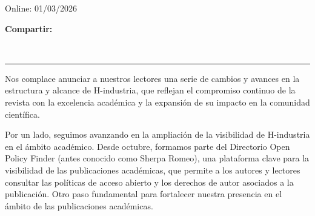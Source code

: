 \documentclass{article}
\begin{document}
\begin{textblock*}{68mm}
{\begin{minipage}[t]{68mm}
Online: 01/03/2026\par
\vspace{6pt}
\vspace{6pt}
{\bfseries\color{azulrevista!70}Compartir:}\par\vspace{3pt}
{\large
\href{https://bsky.app/intent/compose?text=url-html}{}~
\href{mailto:?subject=T%C3%ADtulo%20del%20editorial%20de%20la%20revista&body=url-html}{}~
\href{https://www.facebook.com/sharer/sharer.php?u=url-html}{}~
\href{https://www.linkedin.com/sharing/share-offsite/?url=url-html}{}~
\href{https://www.reddit.com/submit?url=url-html&title=T%C3%ADtulo%20del%20editorial%20de%20la%20revista}{}~
\href{https://www.researchgate.net/search?q=T%C3%ADtulo%20del%20editorial%20de%20la%20revista}{}~
\href{https://t.me/share/url?url=url-html&text=T%C3%ADtulo%20del%20editorial%20de%20la%20revista}{}~
\href{https://wa.me/?text=url-html}{}~
\href{https://twitter.com/intent/tweet?url=url-html&text=T%C3%ADtulo%20del%20editorial%20de%20la%20revista}{}
}\par
\end{minipage}%
}%
\end{textblock*}


\bigskip
\noindent\rule{\linewidth}{0.4pt}
\bigskip

Nos complace anunciar a nuestros lectores una serie de cambios y avances en la estructura y alcance de H-industria, que reflejan el compromiso continuo de la revista con la excelencia académica y la expansión de su impacto en la comunidad científica.

Por un lado, seguimos avanzando en la ampliación de la visibilidad de H-industria en el ámbito académico. Desde octubre, formamos parte del Directorio Open Policy Finder (antes conocido como Sherpa Romeo), una plataforma clave para la visibilidad de las publicaciones académicas, que permite a los autores y lectores consultar las políticas de acceso abierto y los derechos de autor asociados a la publicación. Otro paso fundamental para fortalecer nuestra presencia en el ámbito de las publicaciones académicas.
\end{document}
